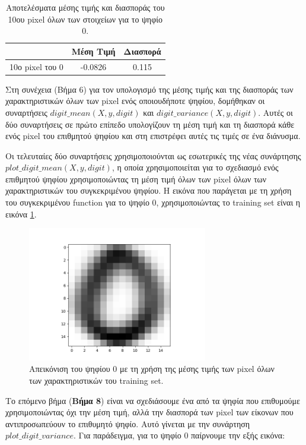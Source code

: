 \documentclass[11pt]{article} %
\begin{document}
\begin{table}[h]
\begin{center}
\begin{tabular}{c c c}
\hline\hline
 & Μέση Τιμή & Διασπορά\\
\hline
10ο pixel του 0 & -0.0826 & 0.115\\
\hline 
\end{tabular}
\caption{Αποτελέσματα μέσης τιμής και διασποράς του 10ου pixel όλων των στοιχείων για το ψηφίο 0.}
\end{center}
\end{table}

Στη συνέχεια (Βήμα 6) για τον υπολογισμό της μέσης τιμής και της διασποράς των χαρακτηριστικών όλων των pixel ενός οποιουδήποτε ψηφίου, δομήθηκαν οι συναρτήσεις $digit\_mean(X, y, digit)$ και $digit\_variance(X, y, digit)$. Αυτές οι δύο συναρτήσεις σε πρώτο επίπεδο υπολογίζουν τη μέση τιμή και τη διασπορά κάθε ενός pixel του επιθμητού ψηφίου και στη επιστρέφει αυτές τις τιμές σε ένα διάνυσμα. 

Οι τελευταίες δύο συναρτήσεις χρησιμοποιούνται ως εσωτερικές της νέας συνάρτησης $plot\_digit\_mean(X, y, digit)$, η οποία χρησιμοποιείται για το σχεδιασμό ενός επιθμητού ψηφίου χρησιμοποιώντας τη μέση τιμή όλων των pixel όλων των χαρακτηριστικών του συγκεκριμένου ψηφίου. Η εικόνα που παράγεται με τη χρήση του συγκεκριμένου function για το ψηφίο 0, χρησιμοποιώντας το training set είναι η εικόνα \ref{fig:step_7}.

\begin{figure}[H]
    \centering
    \includegraphics[width=0.7\textwidth]{plots/Step 7}
    \caption{Απεικόνιση του ψηφίου 0 με τη χρήση της μέσης τιμής των pixel όλων των χαρακτηριστικών του training set.}
    \label{fig:step_7}
\end{figure}

Το επόμενο βήμα (\textbf{Βήμα 8}) είναι να σχεδιάσουμε ένα από τα ψηφία που επιθυμούμε χρησιμοποιώντας όχι την μέση τιμή, αλλά την διασπορά των pixel των είκονων που αντιπροσωπεύουν το επιθυμητό ψηφίο. Αυτό γίνεται με την συνάρτηση $plot\_digit\_variance$. Για παράδειγμα, για το ψηφίο $0$ παίρνουμε την εξής εικόνα:
\end{document}
